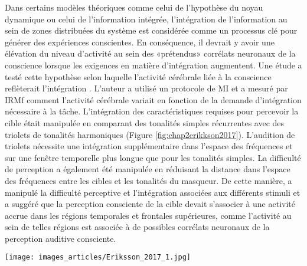 Dans certains modèles théoriques comme celui de l'hypothèse du noyau dynamique ou celui de l'information intégrée, l'intégration de l'information au sein de zones distribuées du système est considérée comme un processus clé pour générer des expériences conscientes. 
En conséquence, il devrait y avoir une élévation du niveau d'activité au sein des «prétendus» corrélats neuronaux de la conscience lorsque les exigences en matière d'intégration augmentent. 
Une étude a testé cette hypothèse selon laquelle l'activité cérébrale liée à la conscience reflèterait l'intégration \citep{eriksson2017activity}. 
L'auteur a utilisé un protocole de MI et a mesuré par IRMf comment l'activité cérébrale variait en fonction de la demande d'intégration nécessaire à la tâche. 
L'intégration des caractéristiques requises pour percevoir la cible était manipulée en comparant des tonalités simples récurrentes avec des triolets de tonalités harmoniques (Figure \ref{fig:chap2erikkson2017}). 
L'audition de triolets nécessite une intégration supplémentaire dans l'espace des fréquences et sur une fenêtre temporelle plus longue que pour les tonalités simples. 
La difficulté de perception a également été manipulée en réduisant la distance dans l'espace des fréquences entre les cibles et les tonalités du masqueur.
De cette manière, \cite{eriksson2017activity} a manipulé la difficulté perceptive et l'intégration associées aux différents stimuli et a suggéré que la perception consciente de la cible devait s'associer à une activité accrue dans les régions temporales et frontales supérieures, comme l'activité au sein de telles régions est associée à de possibles corrélats neuronaux de la perception auditive consciente. 

\begin{figure*}[!t]
\center
\texttt{[image: images\_articles/Eriksson\_2017\_1.jpg]}
\caption[Une partie de l'activité des corrélats neuraux de la conscience reflète l'intégration.]{(Gauche) Représentation graphique des stimuli auditifs employés par \cite{eriksson2017activity}. Une tonalité cible a été présentée à plusieurs reprises dans chaque essai, masquée par des tonalités dans des fréquences supérieures et inférieures à la cible. L'intégration des caractéristiques requises pour percevoir la cible a été manipulée en comparant des tonalités simples récurrentes (A, C) avec des triolets de tonalités harmoniques (B, D ; encerclés). La difficulté de perception a été manipulée en réduisant la région spectrale protégée (AB contre CD ; zones grises). Adapté de \cite{eriksson2017activity}.}
\label{fig:chap2erikkson2017}
\end{figure*}

